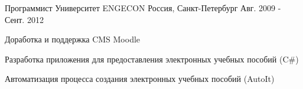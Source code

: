 \begin{cventries}
  \cventry
    {Программист}
    {Университет ENGECON}
    {Россия, Санкт-Петербург}
    {Авг. 2009 - Сент. 2012}
    {
      \begin{cvitems}
        \item {Доработка и поддержка CMS Moodle}
        \item {Разработка приложения для предоставления электронных учебных пособий (C\#)}
        \item {Автоматизация процесса создания электронных учебных пособий (AutoIt)}
      \end{cvitems}
    }

\end{cventries}
